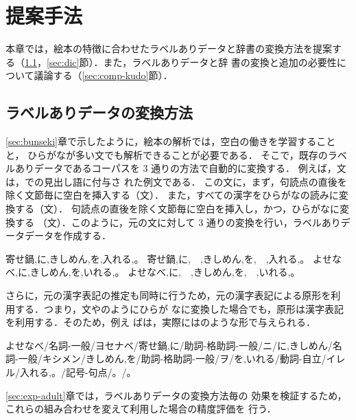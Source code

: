 \documentclass[japanese]{jnlp_1.4}
\newcommand{\lxd}{}
\newcommand{\hinoki}{}
\newcommand{\refs}[1]{}
\newcommand{\ul}{}
\begin{document}
\section{提案手法}
\label{sec:morph}

 本章では，絵本の特徴に合わせたラベルありデータと辞書の変換方法を提案す
 る（\ref{sec:train-data}，\ref{sec:dic}節）．また，ラベルありデータと辞
 書の変換と追加の必要性について議論する（\ref{sec:comp-kudo}節）．


\subsection{ラベルありデータの変換方法}
\label{sec:train-data}


\ref{sec:bunseki}章で示したように，絵本の解析では，空白の働きを学習することと，
ひらがなが多い文でも解析できることが必要である．
そこで，既存のラベルありデータである\hinoki コーパスを 3 通りの方法で自動的に変換する．
例えば，文\refs{lxdex-org}は，\lxd での見出し語\jpn[きしめん]{}に付与さ
れた例文である．
この文に，まず，句読点の直後を除く文節毎に空白を挿入する（文\refs{lxdex-sp}）．
また，すべての漢字をひらがなの読みに変換する（文\refs{lxdex-hira}）．
句読点の直後を除く文節毎に空白を挿入し，かつ，ひらがなに変換する
（文\refs{lxdex-hirasp}）．このように，元の文に対して 3 通りの変換を行い，ラベルありデータデータを作成する．

 \begin{exe} 
 \ex \label{s:lxdex-org}
寄せ鍋,に,きしめん,を,入れる,。
 \ex \label{s:lxdex-sp}
寄せ鍋,に,　,きしめん,を,　,入れる,。
 \ex \label{s:lxdex-hira}
よせなべ,に,きしめん,を,いれる,。
 \ex \label{s:lxdex-hirasp}
よせなべ,に,　,きしめん,を,　,いれる,。
 \end{exe}

 さらに，元の漢字表記の推定も同時に行うため，元の漢字表記による原形を利
 用する．つまり，文\refs{lxdex-hira}や\refs{lxdex-hirasp}のようにひらが
 なに変換した場合でも，原形は漢字表記を利用する．そのため，例え
 ば\refs{lxdex-hira}は，実際には\refs{lxdex-hira-full}のような形で与えられる．

 \begin{exe}
 \ex \label{s:lxdex-hira-full}
よせなべ/名詞-一般/ヨセナベ/\ul{寄せ鍋},に/助詞-格助詞-一般/ニ/に,きしめん/名詞-一般/キシメン/きしめん,を/助詞-格助詞-一般/ヲ/を,いれる/動詞-自立/イレル/\ul{入れる},。/記号-句点/。/。
 \end{exe}

\ref{sec:exp-adult}章では，ラベルありデータの変換方法毎の
 効果を検証するため，これらの組み合わせを変えて利用した場合の精度評価を
 行う．
\end{document}
